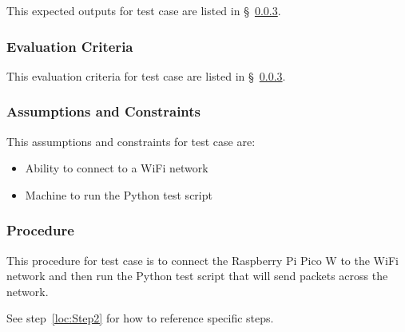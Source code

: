 This expected outputs for test  case  are listed in \S~\ref{loc:TestCaseProcedure\StsTestSpecID\StsTestCaseID}.

\subsubsection{Evaluation Criteria}
\label{loc:TestCaseEvaluationCriteria\StsTestSpecID\StsTestCaseID}
% 

This evaluation criteria for test  case  are listed in \S~\ref{loc:TestCaseProcedure\StsTestSpecID\StsTestCaseID}.

\subsubsection{Assumptions and Constraints}
\label{loc:TestCaseAssumptions\StsTestSpecID\StsTestCaseID}
% 

This assumptions and constraints for test  case  are:

\begin{itemize}
    \item Ability to connect to a WiFi network
    \item Machine to run the Python test script
\end{itemize}

\subsubsection{Procedure}
\label{loc:TestCaseProcedure\StsTestSpecID\StsTestCaseID}
% 

This procedure for test  case  is to connect the Raspberry Pi Pico W to the WiFi network and then run the Python test script that will send packets across the network.

See step~\ref{loc:Step2} for how to reference specific steps.

